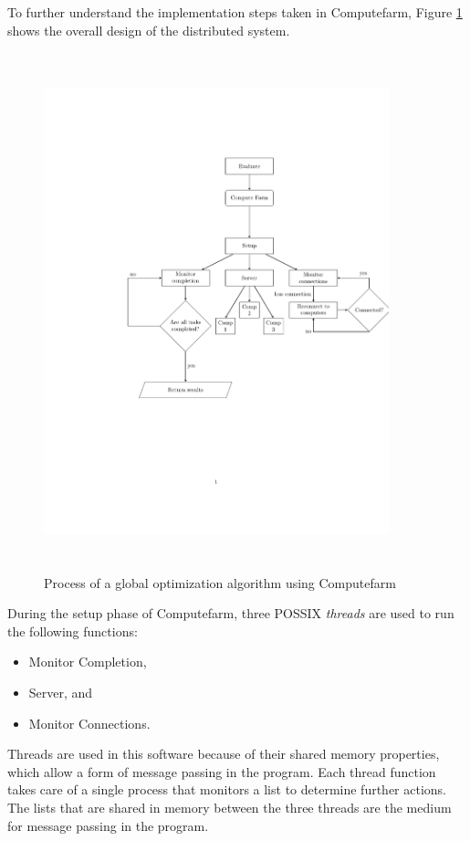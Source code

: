 To further understand the implementation steps taken in Computefarm, Figure \ref{fig:implementation} shows the overall design of the distributed system. 
\clearpage
\begin{figure}[h!]
    \centering
    \includegraphics[width=10cm,height=15cm]{chapters/chapter_3_Software/flowchart2.pdf}
    \caption{Process of a global optimization algorithm using Computefarm}
    \label{fig:implementation}
\end{figure}

During the setup phase of Computefarm, three POSSIX \textit{threads} are used to run the following functions:
\begin{itemize}
    \item Monitor Completion,
    \item Server, and
    \item Monitor Connections. 
\end{itemize}

Threads are used in this software because of their shared memory properties, which allow a form of message passing in the program. Each thread function takes care of a single process that monitors a list to determine further actions. The lists that are shared in memory between the three threads are the medium for message passing in the program. 

